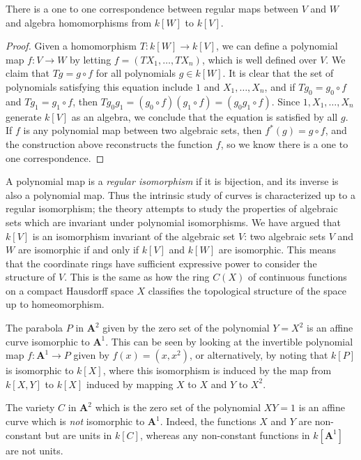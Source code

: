 \begin{prop}
    There is a one to one correspondence between regular maps between $V$ and $W$ and algebra homomorphisms from $k[W]$ to $k[V]$.
\end{prop}
\begin{proof}
    Given a homomorphism $T: k[W] \to k[V]$, we can define a polynomial map $f: V \to W$ by letting $f = (TX_1, \dots, TX_n)$, which is well defined over $V$. We claim that $Tg = g \circ f$ for all polynomials $g \in k[W]$. It is clear that the set of polynomials satisfying this equation include $1$ and $X_1, \dots, X_n$, and if $Tg_0 = g_0 \circ f$ and $Tg_1 = g_1 \circ f$, then $Tg_0g_1 = (g_0 \circ f)(g_1 \circ f) = (g_0g_1 \circ f)$. Since $1,X_1, \dots, X_n$ generate $k[V]$ as an algebra, we conclude that the equation is satisfied by all $g$. If $f$ is any polynomial map between two algebraic sets, then $f^*(g) = g \circ f$, and the construction above reconstructs the function $f$, so we know there is a one to one correspondence.
\end{proof}

A polynomial map is a \emph{regular isomorphism} if it is bijection, and its inverse is also a polynomial map. Thus the intrinsic study of curves is characterized up to a regular isomorphism; the theory attempts to study the properties of algebraic sets which are invariant under polynomial isomorphisms. We have argued that $k[V]$ is an isomorphism invariant of the algebraic set $V$: two algebraic sets $V$ and $W$ are isomorphic if and only if $k[V]$ and $k[W]$ are isomorphic. This means that the coordinate rings have sufficient expressive power to consider the structure of $V$. This is the same as how the ring $C(X)$ of continuous functions on a compact Hausdorff space $X$ classifies the topological structure of the space up to homeomorphism.

\begin{example}
    The parabola $P$ in $\mathbf{A}^2$ given by the zero set of the polynomial $Y = X^2$ is an affine curve isomorphic to $\mathbf{A}^1$. This can be seen by looking at the invertible polynomial map $f: \mathbf{A}^1 \to P$ given by $f(x) = (x,x^2)$, or alternatively, by noting that $k[P]$ is isomorphic to $k[X]$, where this isomorphism is induced by the map from $k[X,Y]$ to $k[X]$ induced by mapping $X$ to $X$ and $Y$ to $X^2$.
\end{example}

\begin{example}
    The variety $C$ in $\mathbf{A}^2$ which is the zero set of the polynomial $XY = 1$ is an affine curve which is \emph{not} isomorphic to $\mathbf{A}^1$. Indeed, the functions $X$ and $Y$ are non-constant but are units in $k[C]$, whereas any non-constant functions in $k[\mathbf{A}^1]$ are not units.
\end{example}


